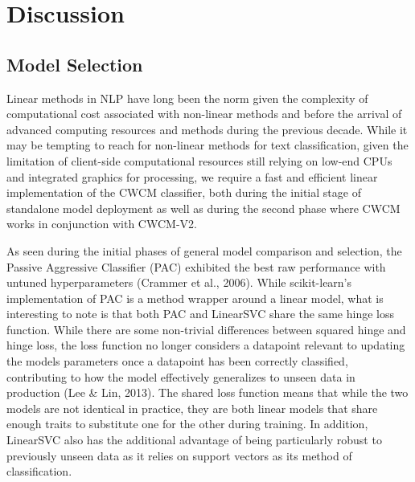 \documentclass[
  titlepage]{article}
\begin{document}
\section{Discussion}\label{discussion}

\subsection{Model Selection}\label{model-selection-1}

Linear methods in NLP have long been the norm given the complexity of
computational cost associated with non-linear methods and before the
arrival of advanced computing resources and methods during the previous
decade. While it may be tempting to reach for non-linear methods for
text classification, given the limitation of client-side computational
resources still relying on low-end CPUs and integrated graphics for
processing, we require a fast and efficient linear implementation of the
CWCM classifier, both during the initial stage of standalone model
deployment as well as during the second phase where CWCM works in
conjunction with CWCM-V2.

As seen during the initial phases of general model comparison and
selection, the Passive Aggressive Classifier (PAC) exhibited the best
raw performance with untuned hyperparameters (Crammer et al., 2006).
While scikit-learn's implementation of PAC is a method wrapper around a
linear model, what is interesting to note is that both PAC and LinearSVC
share the same hinge loss function. While there are some non-trivial
differences between squared hinge and hinge loss, the loss function no
longer considers a datapoint relevant to updating the models parameters
once a datapoint has been correctly classified, contributing to how the
model effectively generalizes to unseen data in production (Lee \& Lin,
2013). The shared loss function means that while the two models are not
identical in practice, they are both linear models that share enough
traits to substitute one for the other during training. In addition,
LinearSVC also has the additional advantage of being particularly robust
to previously unseen data as it relies on support vectors as its method
of classification.
\end{document}
